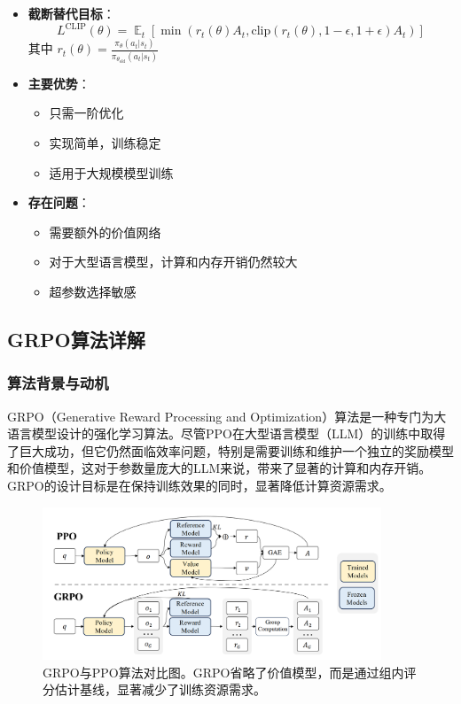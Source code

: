 \documentclass[a4paper, 12pt]{article}
\DeclareMathOperator*{\E}{\mathbb{E}}    %
\begin{document}
\begin{itemize}
    \item \textbf{截断替代目标}：
        \begin{equation}
            L^{\text{CLIP}}(\theta) = \E_t[\min(r_t(\theta)A_t, \text{clip}(r_t(\theta), 1-\epsilon, 1+\epsilon)A_t)]
        \end{equation}
        其中 $r_t(\theta) = \frac{\pi_\theta(a_t|s_t)}{\pi_{\theta_{\text{old}}}(a_t|s_t)}$
    
    \item \textbf{主要优势}：
        \begin{itemize}
            \item 只需一阶优化
            \item 实现简单，训练稳定
            \item 适用于大规模模型训练
        \end{itemize}
    
    \item \textbf{存在问题}：
        \begin{itemize}
            \item 需要额外的价值网络
            \item 对于大型语言模型，计算和内存开销仍然较大
            \item 超参数选择敏感
        \end{itemize}
\end{itemize}

\subsection{GRPO算法详解}
\subsubsection{算法背景与动机}
GRPO（Generative Reward Processing and Optimization）算法是一种专门为大语言模型设计的强化学习算法。尽管PPO在大型语言模型（LLM）的训练中取得了巨大成功，但它仍然面临效率问题，特别是需要训练和维护一个独立的奖励模型和价值模型，这对于参数量庞大的LLM来说，带来了显著的计算和内存开销。GRPO的设计目标是在保持训练效果的同时，显著降低计算资源需求。

\begin{figure}[htbp]
    \centering
    \includegraphics[width=0.9\textwidth]{Images/GRPO.png}
    \caption{GRPO与PPO算法对比图。GRPO省略了价值模型，而是通过组内评分估计基线，显著减少了训练资源需求。}
    \label{fig:grpo_framework}
\end{figure}
\end{document}
